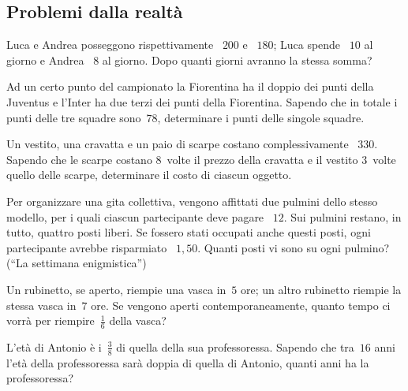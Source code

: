 \subsection{Problemi dalla realtà}
\begin{multicols}{2}
\begin{esercizio}[\Ast]
\label{ese:16.46}
Luca e Andrea posseggono rispettivamente \officialeuro~$200$ e \officialeuro~$180$; Luca spende \officialeuro~$10$ al giorno e Andrea \officialeuro~$8$ al giorno. Dopo quanti giorni avranno la stessa somma?
\end{esercizio}

\begin{esercizio}[\Ast]
\label{ese:16.47}
Ad un certo punto del campionato la Fiorentina ha il doppio dei punti della Juventus e l'Inter ha due terzi dei punti della Fiorentina. Sapendo che in totale i punti delle tre squadre sono~$78$, determinare i punti delle singole squadre.
\end{esercizio}

\begin{esercizio}[\Ast]
\label{ese:16.48}
Un vestito, una cravatta e un paio di scarpe costano complessivamente \officialeuro~$330$. Sapendo che le scarpe costano $8$~volte il prezzo della cravatta e il vestito $3$~volte quello delle scarpe, determinare il costo di ciascun oggetto.
\end{esercizio}

\begin{esercizio}[\Ast]
\label{ese:16.49}
Per organizzare una gita collettiva, vengono affittati due pulmini dello stesso modello, per i quali ciascun partecipante deve pagare \officialeuro~$12$. Sui pulmini restano, in tutto, quattro posti liberi. Se fossero stati occupati anche questi posti, ogni partecipante avrebbe risparmiato \officialeuro~$1,50$. Quanti posti vi sono su ogni pulmino? (``La settimana enigmistica'')
\end{esercizio}

\begin{esercizio}
\label{ese:16.50}
Un rubinetto, se aperto, riempie una vasca in~$5$ ore; un altro rubinetto riempie la stessa vasca in~$7$ ore. Se vengono aperti contemporaneamente, quanto tempo ci vorrà per riempire~$\frac{1}{6}$ della vasca?
\end{esercizio}

\begin{esercizio}[\Ast]
\label{ese:16.51}
L'età di Antonio è i~$\frac{3}{8}$ di quella della sua professoressa. Sapendo che tra~$16$ anni l'età della professoressa sarà doppia di quella di Antonio, quanti anni ha la professoressa?
\end{esercizio}


\end{multicols}
